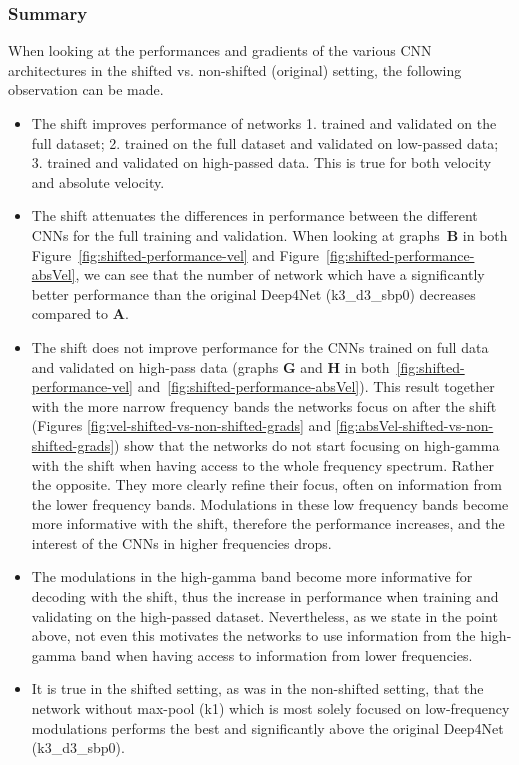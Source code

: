 \subsubsection{Summary}\label{subsubsec:centre-shiftig-summary}
When looking at the performances and gradients of the various CNN architectures in the shifted vs. non-shifted (original) setting, the following observation can be made.
\begin{itemize}
    \item The shift improves performance of networks 1. trained and validated on the full dataset; 2. trained on the full dataset and validated on low-passed data;
    3. trained and validated on high-passed data. This is true for both velocity and absolute velocity.
    
    \item The shift attenuates the differences in performance between the different CNNs for the full training and validation.
    When looking at graphs~\textbf{B} in both Figure~\ref{fig:shifted-performance-vel} and Figure~\ref{fig:shifted-performance-absVel}, we can see that the number of network which have a significantly better performance than the original Deep4Net (k3\_d3\_sbp0) decreases compared to \textbf{A}.
    
    \item The shift does not improve performance for the CNNs trained on full data and validated on high-pass data (graphs \textbf{G} and \textbf{H} in both~\ref{fig:shifted-performance-vel} and~\ref{fig:shifted-performance-absVel}).
    This result together with the more narrow frequency bands the networks focus on after the shift (Figures \ref{fig:vel-shifted-vs-non-shifted-grads} and \ref{fig:absVel-shifted-vs-non-shifted-grads}) show that the networks do not start focusing on high-gamma with the shift when having access to the whole frequency spectrum.
    Rather the opposite.
    They more clearly refine their focus, often on information from the lower frequency bands.
    Modulations in these low frequency bands become more informative with the shift, therefore the performance increases, and the interest of the CNNs in higher frequencies drops.
    
    \item The modulations in the high-gamma band become more informative for decoding with the shift, thus the increase in performance when training and validating on the high-passed dataset.
    Nevertheless, as we state in the point above, not even this motivates the networks to use information from the high-gamma band when having access to information from lower frequencies.
    
    \item It is true in the shifted setting, as was in the non-shifted setting, that the network without max-pool (k1) which is most solely focused on low-frequency modulations performs the best and significantly above the original Deep4Net (k3\_d3\_sbp0).
    
   
\end{itemize}

